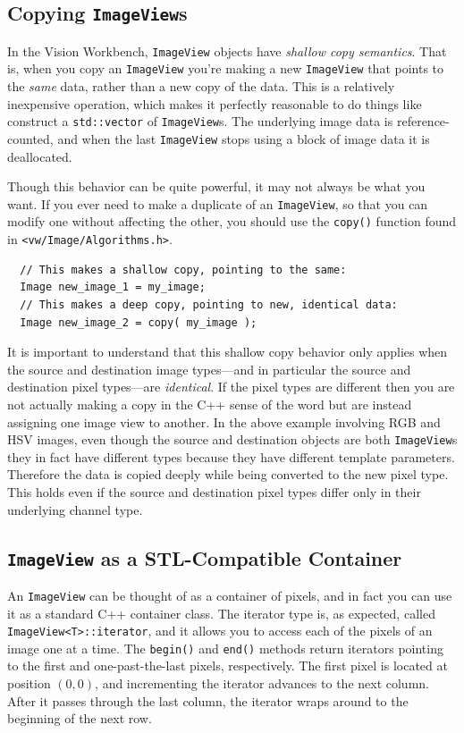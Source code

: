 \subsection{Copying {\tt ImageView}s}

In the Vision Workbench, \verb#ImageView# objects have {\it shallow
copy semantics}.  That is, when you copy an \verb#ImageView# you're
making a new \verb#ImageView# that points to the {\it same} data,
rather than a new copy of the data.  This is a relatively inexpensive
operation, which makes it perfectly reasonable to do things like
construct a \verb#std::vector# of \verb#ImageView#s.  The underlying
image data is reference-counted, and when the last \verb#ImageView#
stops using a block of image data it is deallocated.

Though this behavior can be quite powerful, it may not always be 
what you want.  If you ever need to make a duplicate of an 
\verb#ImageView#, so that you can modify one without affecting the 
other, you should use the \verb#copy()# function found in 
\verb#<vw/Image/Algorithms.h>#.
\begin{verbatim}
  // This makes a shallow copy, pointing to the same:
  Image new_image_1 = my_image;
  // This makes a deep copy, pointing to new, identical data:
  Image new_image_2 = copy( my_image );
\end{verbatim}

It is important to understand that this shallow copy behavior only
applies when the source and destination image types---and in particular
the source and destination pixel types---are {\it identical}.  If the
pixel types are different then you are not actually making a copy in 
the C++ sense of the word but are instead assigning one image view to 
another.  In the above example involving RGB and HSV images, even 
though the source and destination objects are both \verb#ImageView#s 
they in fact have different types because they have different template 
parameters.  Therefore the data is copied deeply while being converted 
to the new pixel type.  This holds even if the source and destination 
pixel types differ only in their underlying channel type.

\subsection{{\tt ImageView} as a STL-Compatible Container}

An \verb#ImageView# can be thought of as a container of pixels, and in
fact you can use it as a standard C++ container class.  The iterator
type is, as expected, called \verb#ImageView<T>::iterator#, and it
allows you to access each of the pixels of an image one at a time.
The \verb#begin()# and \verb#end()# methods return iterators pointing
to the first and one-past-the-last pixels, respectively.  The first
pixel is located at position $(0,0)$, and incrementing the iterator
advances to the next column.  After it passes through the last column,
the iterator wraps around to the beginning of the next row.

